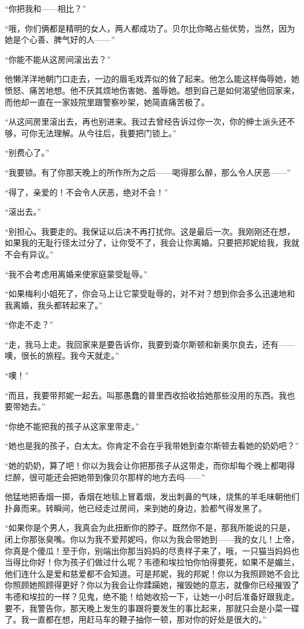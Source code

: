 \par “你把我和——相比？”
\par “哦，你们俩都是精明的女人，两人都成功了。贝尔比你略占些优势，当然，因为她是个心善、脾气好的人——”
\par “你能不能从这房间滚出去？”
\par 他懒洋洋地朝门口走去，一边的眉毛戏弄似的耸了起来。他怎么能这样侮辱她，她愤怒、痛苦地想。他不厌其烦地伤害她、羞辱她。想到自己是如何渴望他回家来，而他却一直在一家妓院里跟警察吵架，她简直痛苦极了。
\par “从这间房里滚出去，再也别进来。我过去曾经告诉过你一次，你的绅士派头还不够，可你无法理解。从今往后，我要把门锁上。”
\par “别费心了。”
\par “我要锁。有了你那天晚上的所作所为之后——喝得那么醉，那么令人厌恶——”
\par “得了，亲爱的！不会令人厌恶，绝对不会！”
\par “滚出去。”
\par “别担心。我要走的。我保证以后决不再打扰你。这是最后一次。我刚刚还在想，如果我的无耻行径太过分了，让你受不了，我会让你离婚。只要把邦妮给我，我就不会有异议。”
\par “我不会考虑用离婚来使家庭蒙受耻辱。”
\par “如果梅利小姐死了，你会马上让它蒙受耻辱的，对不对？想到你会多么迅速地和我离婚，我头都转起来了。”
\par “你走不走？”
\par “走，我马上走。我回家来是要告诉你，我要到查尔斯顿和新奥尔良去，还有——噢，很长的旅程。我今天就走。”
\par “噢！”
\par “而且，我要带邦妮一起去。叫那愚蠢的普里西收拾收拾她那些没用的东西。我也要带她去。”
\par “你绝不能把我的孩子从这家里带走。”
\par “她也是我的孩子，白太太。你肯定不会在乎我带她到查尔斯顿去看她的奶奶吧？”
\par “她的奶奶，算了吧！你以为我会让你把那孩子从这带走，而你却每个晚上都喝得烂醉，很可能还会把她带到像贝尔那样的地方去吗——”
\par 他猛地把香烟一掷，香烟在地毯上冒着烟，发出刺鼻的气味，烧焦的羊毛味朝他们扑鼻而来。转瞬间，他已经走过房间，来到她的身边，脸都气得发黑了。
\par “如果你是个男人，我真会为此扭断你的脖子。既然你不是，那我所能说的只是，闭上你那张臭嘴。你以为我不爱邦妮吗，你以为我会带她到——我的女儿！上帝，你真是个傻瓜！至于你，别端出你那当妈妈的尽责样子来了，哦，一只猫当妈妈也当得比你好！你为孩子们做过什么呢？韦德和埃拉怕你怕得要死，如果不是媚兰，他们连什么是爱和慈爱都不会知道。可是邦妮，我的邦妮！你以为我照顾她不会比你照顾她照顾得更好？你以为我会让你蹂躏她，摧毁她的意志，就像你已经摧毁了韦德和埃拉的一样？见鬼，绝不能！给她收拾一下，让她一小时后准备好跟我走。要不，我警告你，那天晚上发生的事跟将要发生的事比起来，那就只会是小菜一碟了。我一直都在想，用赶马车的鞭子抽你一顿，那对你的好处是很大的。”
